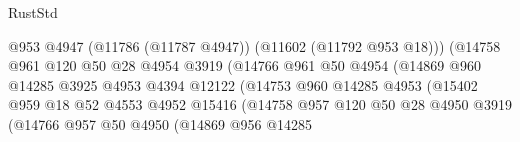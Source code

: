 \begin{lexlean}{RustStd}
\begin{coremodule}
                                            @953
                                            @4947
                                            (@11786 (@11787 @4947))
                                            (@11602 (@11792 @953 @18)))
                                          (@14758
                                            @961
                                            @120
                                            @50
                                            @28
                                            @4954
                                            @3919
                                            (@14766
                                              @961
                                              @50
                                              @4954
                                              (@14869
                                                @960
                                                @14285
                                                @3925
                                                @4953
                                                @4394
                                                @12122
                                                (@14753
                                                  @960
                                                  @14285
                                                  @4953
                                                  (@15402
                                                    @959
                                                    @18
                                                    @52
                                                    @4553
                                                    @4952
                                                    @15416
                                                    (@14758
                                                      @957
                                                      @120
                                                      @50
                                                      @28
                                                      @4950
                                                      @3919
                                                      (@14766
                                                        @957
                                                        @50
                                                        @4950
                                                        (@14869
                                                          @956
                                                          @14285

\end{coremodule}
\end{lexlean}
